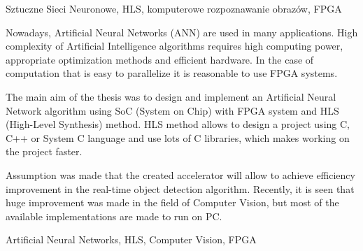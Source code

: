 \documentclass[
    left=2.5cm,         %
    right=2.5cm,        %
    top=2.5cm,          %
    bottom=3cm,         %
    bindingoffset=6mm,  %
    nohyphenation=false %
]{eiti/eiti-thesis}
\begin{document}
\slowakluczowe Sztuczne Sieci Neuronowe, HLS, komputerowe rozpoznawanie 
obrazów, FPGA

\cleardoublepage  %

\abstract
Nowadays, Artificial Neural Networks (ANN) are used in many applications. 
High complexity of Artificial Intelligence algorithms requires high 
computing power, appropriate optimization methods and efficient hardware. 
In the case of computation that is easy to parallelize it is reasonable 
to use FPGA systems.

The main aim of the thesis was to design and implement an Artificial 
Neural Network algorithm using SoC (System on Chip) with FPGA system 
and HLS (High-Level Synthesis) method. HLS method allows to design a 
project using C, C++ or System C language and use lots of C libraries, 
which makes working on the project faster.


Assumption was made that the created accelerator will allow to achieve 
efficiency improvement in the real-time object detection algorithm. 
Recently, it is seen that huge improvement was made in the field of 
Computer Vision, but most of the available implementations are made to 
run on PC.

\keywords Artificial Neural Networks, HLS, Computer Vision, FPGA

\cleardoublepage  %
\pagestyle{plain}
\makeauthorship
\cleardoublepage %
\tableofcontents

\cleardoublepage %
\pagestyle{headings}



\end{document}
